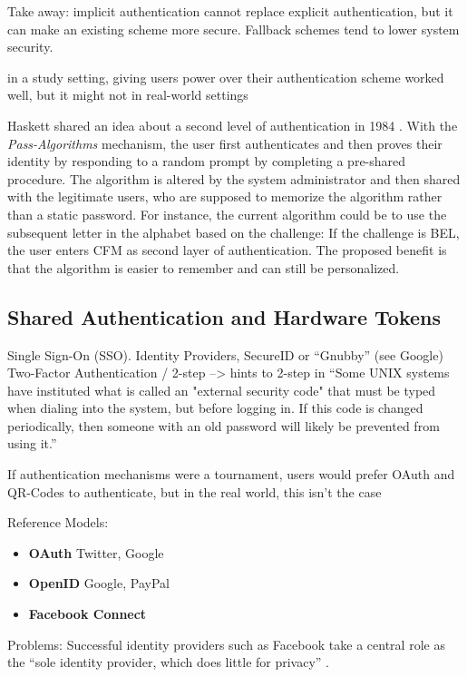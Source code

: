 	Take away: implicit authentication cannot replace explicit authentication, but it can make an existing scheme more secure. Fallback schemes tend to lower system security. 
	

in a study setting, giving users power over their authentication scheme worked well, but it might not in real-world settings \cite{Forget2015CYOA}

Haskett shared an idea about a second level of authentication in 1984 \cite{Haskett1984PassAlgorithms}. With the \textit{Pass-Algorithms} mechanism, the user first authenticates and then proves their identity by responding to a random prompt by completing a pre-shared procedure. The algorithm is altered by the system administrator and then shared with the legitimate users, who are supposed to memorize the algorithm rather than a static password. For instance, the current algorithm could be to use the subsequent letter in the alphabet based on the challenge: If the challenge is BEL, the user enters CFM as second layer of authentication. The proposed benefit is that the algorithm is easier to remember and can still be personalized. 
	
	\subsection{Shared Authentication and Hardware Tokens}\label{sec:rw:shared_auth_tokens}
Single Sign-On (SSO). 
Identity Providers, 
SecureID or ``Gnubby'' (see Google)
Two-Factor Authentication / 2-step --> hints to 2-step in ``Some UNIX systems have instituted what is called an "external security code" that must be typed when dialing into the system, but before logging in. If this code is changed periodically, then someone with an old password will likely be prevented from using it.'' \cite{Morris1979PasswordSecurity}


If authentication mechanisms were a tournament, users would prefer OAuth and QR-Codes to authenticate, but in the real world, this isn't the case \cite{Ruoti2015AuthenticationMelee}

Reference Models:
\cite{Egelman2013ProfilePassword,Sun2010BillionKeys}

\begin{itemize}
\item \textbf{OAuth} Twitter, Google
\item \textbf{OpenID} Google, PayPal
\item \textbf{Facebook Connect} 
\end{itemize}
Problems: 
Successful identity providers such as Facebook take a central role as the ``sole identity provider, which does little for privacy'' \cite{Bonneau2015ImperfectAuthentication}.


